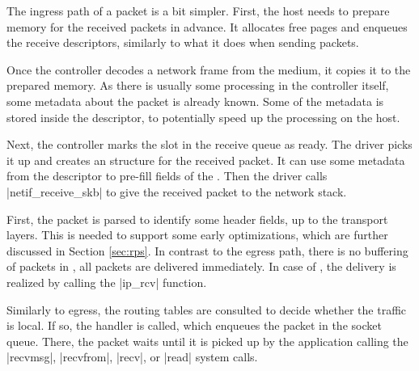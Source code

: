 The ingress path of a packet is a bit simpler. First, the host needs to prepare
memory for the received packets in advance. It allocates free pages and
enqueues the receive descriptors, similarly to what it does when sending
packets.

Once the controller decodes a network frame from the medium, it copies it to
the prepared memory. As there is usually some processing in the controller
itself, some metadata about the packet is already known. Some of the metadata
is stored inside the descriptor, to potentially speed up the processing on the
host.

Next, the controller marks the slot in the receive queue as ready. The driver
picks it up and creates an \skb{} structure for the received packet. It can use
some metadata from the descriptor to pre-fill fields of the \skb{}. Then the
driver calls \fnc|netif_receive_skb| to give the received packet to the network
stack.

First, the packet is parsed to identify some header fields, up to the
transport layers. This is needed to support some early optimizations, which are
further discussed in Section \ref{sec:rps}. In contrast to the egress path, there
is no buffering of packets in , all packets are delivered
immediately. In case of , the delivery is realized by calling the
\fnc|ip_rcv| function.

Similarly to egress, the routing tables are consulted to decide whether the
traffic is local. If so, the  handler is called, which enqueues the
packet in the socket queue. There, the packet waits until it is picked up by the
application calling the \fnc|recvmsg|, \fnc|recvfrom|, \fnc|recv|,
or \fnc|read| system calls.
